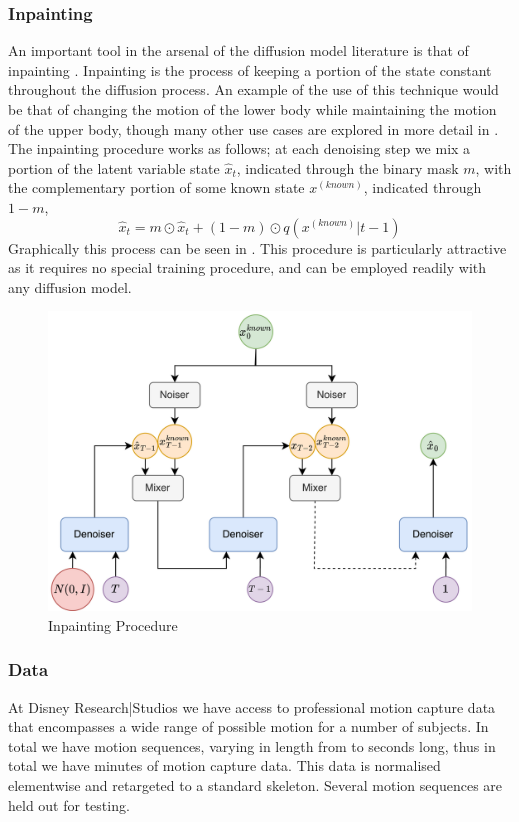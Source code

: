 \subsubsection{Inpainting}
\label{sec:diffusion_method_inpainting}

An important tool in the arsenal of the diffusion model literature is that of inpainting \cite{diffusion_inpainting}. Inpainting is the process of keeping a portion of the state constant throughout the diffusion process. An example of the use of this technique would be that of changing the motion of the lower body while maintaining the motion of the upper body, though many other use cases are explored in more detail in . The inpainting procedure works as follows; at each denoising step we mix a portion of the latent variable state $\hat{x}_t$, indicated through the binary mask $m$, with the complementary portion of some known state $x^{(known)}$, indicated through $1-m$, 
\begin{equation}
    \hat{x}_{t} = m \odot \hat{x}_t + (1-m) \odot q(x^{(known)}|t-1)
\end{equation}
Graphically this process can be seen in . This procedure is particularly attractive as it requires no special training procedure, and can be employed readily with any diffusion model.

\begin{figure}[!ht]
    \centering
    \includegraphics[width=1\textwidth]{Figures/diffusion/Inpainting.png}
    \caption{Inpainting Procedure}
    \label{fig:inpainting}
\end{figure}


\subsubsection{Data}
At Disney Research|Studios we have access to professional motion capture data that encompasses a wide range of possible motion for a number of subjects. In total we have  motion sequences, varying in length from  to  seconds long, thus in total we have  minutes of motion capture data. This data is normalised elementwise and retargeted to a standard skeleton. Several motion sequences are held out for testing.

